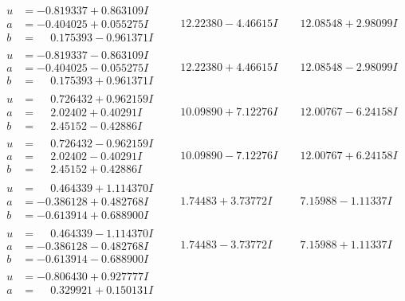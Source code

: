 \documentclass[1p]{elsarticle_modified}
\theoremstyle{definition}
\begin{document}
$$\begin{array}{c|c|c}
\begin{aligned}
u &= -0.819337 + 0.863109 I \\
a &= -0.404025 + 0.055275 I \\
b &= \phantom{-}0.175393 - 0.961371 I\end{aligned}
 & \phantom{-}12.22380 - 4.46615 I & \phantom{-}12.08548 + 2.98099 I \\ \hline\begin{aligned}
u &= -0.819337 - 0.863109 I \\
a &= -0.404025 - 0.055275 I \\
b &= \phantom{-}0.175393 + 0.961371 I\end{aligned}
 & \phantom{-}12.22380 + 4.46615 I & \phantom{-}12.08548 - 2.98099 I \\ \hline\begin{aligned}
u &= \phantom{-}0.726432 + 0.962159 I \\
a &= \phantom{-}2.02402 + 0.40291 I \\
b &= \phantom{-}2.45152 - 0.42886 I\end{aligned}
 & \phantom{-}10.09890 + 7.12276 I & \phantom{-}12.00767 - 6.24158 I \\ \hline\begin{aligned}
u &= \phantom{-}0.726432 - 0.962159 I \\
a &= \phantom{-}2.02402 - 0.40291 I \\
b &= \phantom{-}2.45152 + 0.42886 I\end{aligned}
 & \phantom{-}10.09890 - 7.12276 I & \phantom{-}12.00767 + 6.24158 I \\ \hline\begin{aligned}
u &= \phantom{-}0.464339 + 1.114370 I \\
a &= -0.386128 + 0.482768 I \\
b &= -0.613914 + 0.688900 I\end{aligned}
 & \phantom{-}1.74483 + 3.73772 I & \phantom{-}7.15988 - 1.11337 I \\ \hline\begin{aligned}
u &= \phantom{-}0.464339 - 1.114370 I \\
a &= -0.386128 - 0.482768 I \\
b &= -0.613914 - 0.688900 I\end{aligned}
 & \phantom{-}1.74483 - 3.73772 I & \phantom{-}7.15988 + 1.11337 I \\ \hline\begin{aligned}
u &= -0.806430 + 0.927777 I \\
a &= \phantom{-}0.329921 + 0.150131 I \\

\end{aligned}
\end{array}$$
\end{document}
